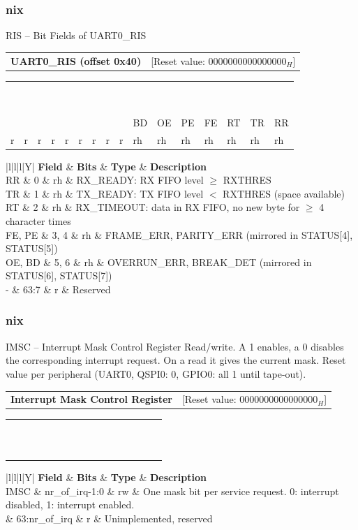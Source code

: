 \documentclass{beamer}
\makeatletter
\newcommand{\astitle}{nix}
\newcommand{\assubtitle}{nix}
\newcommand{\asregkopf}[2]{%
{\scriptsize
\begin{tabularx}{\textwidth}{@{}Xr@{}}
  \textbf{#1} & [Reset value: {#2}]
\end{tabularx}}\par}
\newcommand{\asregfourxsixteen}[8]{%
{\tiny\setlength{\tabcolsep}{1pt}\renewcommand{\arraystretch}{0.95}%
\begin{tabularx}{\textwidth}{|*{16}{>{\centering\arraybackslash}X|}}
  \hline
  63 & 62 & 61 & 60 & 59 & 58 & 57 & 56 & 55 & 54 & 53 & 52 & 51 & 50 & 49 & 48 \\
  \hline
  #1 \\
  \hline
  #2 \\
  \hline
  \hline
  47 & 46 & 45 & 44 & 43 & 42 & 41 & 40 & 39 & 38 & 37 & 36 & 35 & 34 & 33 & 32 \\
  \hline
  #3 \\
  \hline
  #4 \\
  \hline
  \hline
  31 & 30 & 29 & 28 & 27 & 26 & 25 & 24 & 23 & 22 & 21 & 20 & 19 & 18 & 17 & 16 \\
  \hline
  #5 \\
  \hline
  #6 \\
  \hline
  \hline
  15 & 14 & 13 & 12 & 11 & 10 & 09 & 08 & 07 & 06 & 05 & 04 & 03 & 02 & 01 & 00 \\
  \hline
  #7 \\
  \hline
  #8 \\
  \hline
\end{tabularx}}\par}
\newcommand{\asregdesc}[1]{%
{\tiny\renewcommand{\arraystretch}{1.1}%
\begin{tabularx}{\dimexpr\textwidth-1.1cm\relax}{|l|l|l|Y|}
  \hline
  \textbf{Field} & \textbf{Bits} & \textbf{Type} & \textbf{Description} \\
  \hline
  #1 \\
  \hline
\end{tabularx}}\par}
\newcommand{\asrow}[1]{\multicolumn{16}{|c|}{#1}}
\makeatother
\begin{document}
\renewcommand{\assubtitle}{RIS -- Bit Fields of UART0\_RIS}
\begin{frame}
\frametitle{\astitle}
\begin{block}{\assubtitle}
\asregkopf{UART0\_RIS (offset 0x40)}{$0000000000000000_H$}
\asregfourxsixteen{\asrow{0}}{\asrow{r}}
                  {\asrow{0}}{\asrow{r}}
                  {\asrow{0}}{\asrow{r}}
                  {0&0&0&0&0&0&0&0&0&BD&OE&PE&FE&RT&TR&RR}
                  {r&r&r&r&r&r&r&r&r&rh&rh&rh&rh&rh&rh&rh}
\vspace{2pt}
\asregdesc{RR & 0 & rh & RX\_READY: RX FIFO level $\geq$ RXTHRES \\
           \hline
           TR & 1 & rh & TX\_READY: TX FIFO level $<$ RXTHRES (space available) \\
           \hline
           RT & 2 & rh & RX\_TIMEOUT: data in RX FIFO, no new byte for $\geq$ 4 character times \\
           \hline
           FE, PE & 3, 4 & rh & FRAME\_ERR, PARITY\_ERR (mirrored in STATUS[4], STATUS[5]) \\
           \hline
           OE, BD & 5, 6 & rh & OVERRUN\_ERR, BREAK\_DET (mirrored in STATUS[6], STATUS[7]) \\
           \hline
           - & 63:7 & r & Reserved}
\end{block}
\end{frame}

\renewcommand{\assubtitle}{IMSC -- Interrupt Mask Control Register}
\begin{frame}
\frametitle{\astitle}
\begin{block}{\assubtitle}
{\tiny Read/write. A 1 enables, a 0 disables the corresponding interrupt request.
On a read it gives the current mask. Reset value per peripheral
(UART0, QSPI0: 0, GPIO0: all 1 until tape-out).}
\vspace{2pt}
\asregkopf{Interrupt Mask Control Register}{$0000000000000000_H$}
\asregfourxsixteen{\asrow{0}}{\asrow{r}}
                  {\asrow{0}}{\asrow{r}}
                  {\asrow{0}}{\asrow{r}}
                  {\multicolumn{16}{|c|}{0 / IMSC}}{\multicolumn{16}{|c|}{r / rw}}
\vspace{2pt}
\asregdesc{IMSC & nr\_of\_irq-1:0 & rw & One mask bit per service request. 0: interrupt disabled, 1: interrupt enabled. \\
           \hline
           0 & 63:nr\_of\_irq & r & Unimplemented, reserved}
\end{block}
\end{frame}
\end{document}
